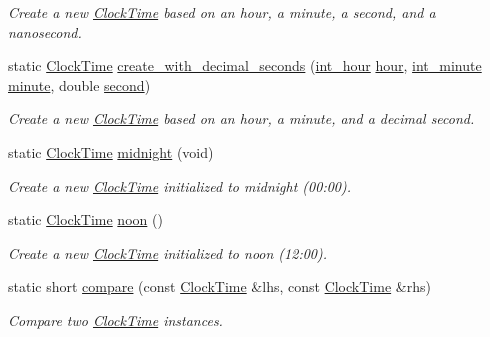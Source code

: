 \begin{DoxyCompactItemize}
\begin{DoxyCompactList}\small\item\em Create a new \hyperlink{structClockTime}{Clock\-Time} based on an hour, a minute, a second, and a nanosecond. \end{DoxyCompactList}\item 
static \hyperlink{structClockTime}{Clock\-Time} \hyperlink{structClockTime_a71e4e398da2cb0cfd3adb3f87cb6f3c2}{create\-\_\-with\-\_\-decimal\-\_\-seconds} (\hyperlink{types_8h_abc83767329d565949a30f9990b5b2323}{int\-\_\-hour} \hyperlink{structClockTime_a46aca2fc3ed57f80398729383d7b81d3}{hour}, \hyperlink{types_8h_ac1c9417e7360815b48bbc1efa2b8240c}{int\-\_\-minute} \hyperlink{structClockTime_a812681b81ece92f27756f0618e56f37b}{minute}, double \hyperlink{structClockTime_a568f139cb2e19fca3e2ae2acdf47787f}{second})
\begin{DoxyCompactList}\small\item\em Create a new \hyperlink{structClockTime}{Clock\-Time} based on an hour, a minute, and a decimal second. \end{DoxyCompactList}\item 
static \hyperlink{structClockTime}{Clock\-Time} \hyperlink{structClockTime_a86812abf316c02aac86f9d8b0a0e0f28}{midnight} (void)
\begin{DoxyCompactList}\small\item\em Create a new \hyperlink{structClockTime}{Clock\-Time} initialized to midnight (00\-:00). \end{DoxyCompactList}\item 
static \hyperlink{structClockTime}{Clock\-Time} \hyperlink{structClockTime_ae206b86808ff1d0158cbc920eb289797}{noon} ()
\begin{DoxyCompactList}\small\item\em Create a new \hyperlink{structClockTime}{Clock\-Time} initialized to noon (12\-:00). \end{DoxyCompactList}\item 
static short \hyperlink{structClockTime_a96d2948e3c535a711899fbe1e393e3af}{compare} (const \hyperlink{structClockTime}{Clock\-Time} \&lhs, const \hyperlink{structClockTime}{Clock\-Time} \&rhs)
\begin{DoxyCompactList}\small\item\em Compare two \hyperlink{structClockTime}{Clock\-Time} instances. \end{DoxyCompactList}\end{DoxyCompactItemize}
